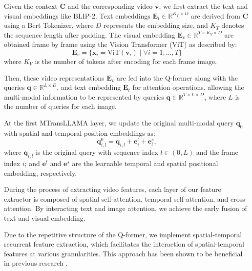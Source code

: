 Given the context $\mathbf{C}$ and the corresponding video $\mathbf{v}$, we first extract the text and visual embeddings like BLIP-2. Text embeddings $\mathbf{E}_t \in \mathbb{R}^{K_T \times D}$ are derived from $\mathbf{C}$ using a Bert Tokenizer, where $D$ represents the embedding size, and $K_T$ denotes the sequence length after padding. 
The visual embedding $\mathbf{E}_v \in \mathbb{R}^{T \times K_V \times D}$ are obtained frame by frame using the Vision Transformer (ViT) as described by:
\begin{equation}
\label{eq:visual extract}
    \mathbf{E}_v =  \{ \mathbf{x}_{i}= \text{ViT}(\mathbf{v}_{i}) \mid \forall i = 1,...,T\}
\end{equation}
where $K_V$ is the number of tokens after encoding for each frame image.

Then, these video representations $\mathbf{E}_v$ are fed into the Q-former along with the queries $\mathbf{q} \in \mathbb{R}^{L \times D}$, and text embedding $\mathbf{E}_t$ for attention operations, allowing the multi-modal information to be represented by queries $\mathbf{q} \in \mathbb{R}^{T \times L \times D}$, where $L$ is the number of queries for each image.

At the first MTransLLAMA layer, we update the original multi-modal query $\mathbf{q}_0$ with spatial and temporal position embeddings as:
\begin{equation}
\label{eq3}
    \mathbf{q}^0_{i,l} = \mathbf{q}_{i,l} + \mathbf{e}^t_{i} + \mathbf{e}^s_{l},
\end{equation}
where $\mathbf{q}_{i,l}$ is the original query with sequence index $l \in (0,L)$ and the frame index $i$; and $\mathbf{e}^t$ and $\mathbf{e}^s$ are the learnable temporal and spatial positional embedding, respectively.

During the process of extracting video features, each layer of our feature extractor is composed of spatial self-attention, temporal self-attention, and cross-attention. By interacting text and image attention, we achieve the early fusion of text and visual embedding.

Due to the repetitive structure of the Q-former, we implement spatial-temporal recurrent feature extraction, which facilitates the interaction of spatial-temporal features at various granularities. This approach has been shown to be beneficial in previous research \cite{xiao2022video}.
